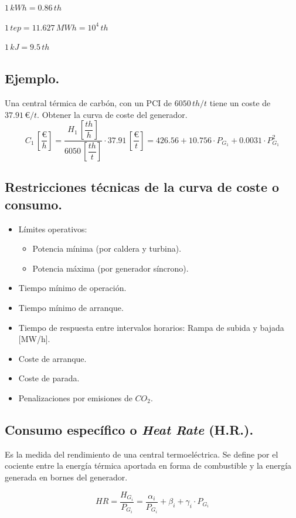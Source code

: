 			$1\,kWh = 0.86\,th$
			
			$1\,tep = 11.627\,MWh = 10^4\,th$
			
			$1\,kJ = 9.5\,th$
			
		\subsection*{Ejemplo.}
			Una central térmica de carbón, con un PCI de $6050\,th/t$ tiene un coste de $37.91\,\euro/t$. Obtener la curva de coste del generador.
			\[C_1\,\left[\dfrac{\euro}{h}\right] = \dfrac{H_1\,\left[\dfrac{th}{h}\right]}{6050\,\left[\dfrac{th}{t}\right]} \cdot 37.91\,\left[\dfrac{\euro}{t}\right] = 426.56 + 10.756\cdot P_{G_1} + 0.0031\cdot P_{G_1}^2\]
			
		\subsection{Restricciones técnicas de la curva de coste o consumo.}
			\begin{itemize}
				\item Límites operativos:
				\begin{itemize}
					\item Potencia mínima (por caldera y turbina).
					\item Potencia máxima (por generador síncrono).
				\end{itemize}
				
				\item Tiempo mínimo de operación.
				\item Tiempo mínimo de arranque.
				\item Tiempo de respuesta entre intervalos horarios: Rampa de subida y bajada [MW/h].
				\item Coste de arranque.
				\item Coste de parada.
				\item Penalizaciones por emisiones de $CO_2$.
			\end{itemize}
			
		\subsection{Consumo específico o \textit{Heat Rate} (H.R.).}
			Es la medida del rendimiento de una central termoeléctrica. Se define por el cociente entre la energía térmica aportada en forma de combustible y la energía generada en bornes del generador.
			
			\[HR = \dfrac{H_{G_i}}{P_{G_i}} = \dfrac{\alpha_i}{P_{G_i}} + \beta_i + \gamma_i\cdot P_{G_i}\]
			
